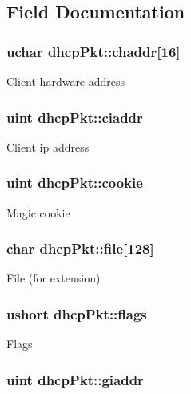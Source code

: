 \subsection{Field Documentation}
\hypertarget{structdhcpPkt_a1d2bb27b495c49626b834f9bdea85ead}{
\subsubsection[{chaddr}]{\setlength{\rightskip}{0pt plus 5cm}uchar dhcp\-Pkt\-::chaddr\mbox{[}16\mbox{]}}}\label{structdhcpPkt_a1d2bb27b495c49626b834f9bdea85ead}
Client hardware address \hypertarget{structdhcpPkt_ad9d4c8cb18c57e8b59b929325024b170}{
\subsubsection[{ciaddr}]{\setlength{\rightskip}{0pt plus 5cm}uint dhcp\-Pkt\-::ciaddr}}\label{structdhcpPkt_ad9d4c8cb18c57e8b59b929325024b170}
Client ip address \hypertarget{structdhcpPkt_adee276232c86a6e9e7a2f815236d0648}{
\subsubsection[{cookie}]{\setlength{\rightskip}{0pt plus 5cm}uint dhcp\-Pkt\-::cookie}}\label{structdhcpPkt_adee276232c86a6e9e7a2f815236d0648}
Magic cookie \hypertarget{structdhcpPkt_a08a75af14420f1815ebddb7cb7dafb7c}{
\subsubsection[{file}]{\setlength{\rightskip}{0pt plus 5cm}char dhcp\-Pkt\-::file\mbox{[}128\mbox{]}}}\label{structdhcpPkt_a08a75af14420f1815ebddb7cb7dafb7c}
File (for extension) \hypertarget{structdhcpPkt_a5277e2cefb888b35e414f113c045112e}{
\subsubsection[{flags}]{\setlength{\rightskip}{0pt plus 5cm}ushort dhcp\-Pkt\-::flags}}\label{structdhcpPkt_a5277e2cefb888b35e414f113c045112e}
Flags \hypertarget{structdhcpPkt_a956d85f55011edee0aef50875bba0fea}{
\subsubsection[{giaddr}]{\setlength{\rightskip}{0pt plus 5cm}uint dhcp\-Pkt\-::giaddr}}\label{structdhcpPkt_a956d85f55011edee0aef50875bba0fea}
